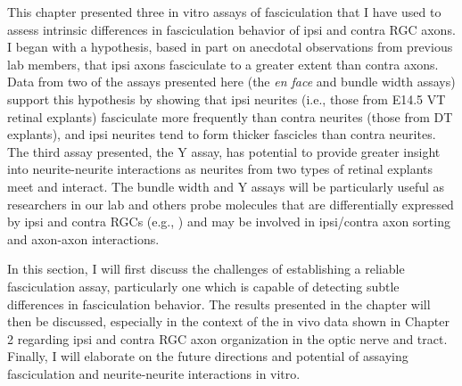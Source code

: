 This chapter presented three in vitro assays of fasciculation that I have used to assess intrinsic differences in fasciculation behavior of ipsi and contra RGC axons.
I began with a hypothesis, based in part on anecdotal observations from previous lab members, that ipsi axons fasciculate to a greater extent than contra axons.
Data from two of the assays presented here (the \emph{en face} and bundle width assays) support this hypothesis by showing that ipsi neurites (i.e., those from E14.5 VT retinal explants) fasciculate more frequently than contra neurites (those from DT explants), and ipsi neurites tend to form thicker fascicles than contra neurites.
The third assay presented, the Y assay, has potential to provide greater insight into neurite-neurite interactions as neurites from two types of retinal explants meet and interact.
The bundle width and Y assays will be particularly useful as researchers in our lab and others probe molecules that are differentially expressed by ipsi and contra RGCs (e.g., ) and may be involved in ipsi/contra axon sorting and axon-axon interactions.

In this section, I will first discuss the challenges of establishing a reliable fasciculation assay, particularly one which is capable of detecting subtle differences in fasciculation behavior.
The results presented in the chapter will then be discussed, especially in the context of the in vivo data shown in Chapter 2 regarding ipsi and contra RGC axon organization in the optic nerve and tract.
Finally, I will elaborate on the future directions and potential of assaying fasciculation and neurite-neurite interactions in vitro.
